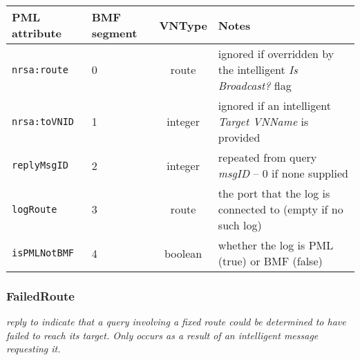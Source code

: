 \documentclass[pdftex,a4paper]{article}
\newcommand{\XMLfont}[1]{{\tt \small #1}}
\begin{document}
\begin{table}[!h]
  \begin{center}
    \label{tab:ReplyLog}
    \begin{tabular}{|l|p{13mm}|c|p{60mm}|}
      \hline

      \textbf{PML attribute} & \textbf{BMF segment} & \textbf{VNType}
      & \textbf{Notes} \\\hline

      \XMLfont{nrsa:route} & 0 & route & ignored if overridden by the
      intelligent {\em Is Broadcast?} flag \\ \hline

      \XMLfont{nrsa:toVNID} & 1 & integer & ignored if an intelligent {\em
      Target VNName} is provided \\\hline

      \XMLfont{replyMsgID} & 2 & integer & repeated from query {\em
      msgID} -- 0 if none supplied \\\hline

      \XMLfont{logRoute} & 3 & route & the port that the log is
      connected to (empty if no such log) \\\hline

      \XMLfont{isPMLNotBMF} & 4 & boolean & whether the log is
      PML (true) or BMF (false) \\\hline

    \end{tabular}
  \end{center}
\end{table}

\clearpage

\subsubsection{FailedRoute}
{\em reply to indicate that a query involving a fixed route could be
  determined to have failed to reach its target. Only occurs as a result
  of an intelligent message requesting it.}
\end{document}
